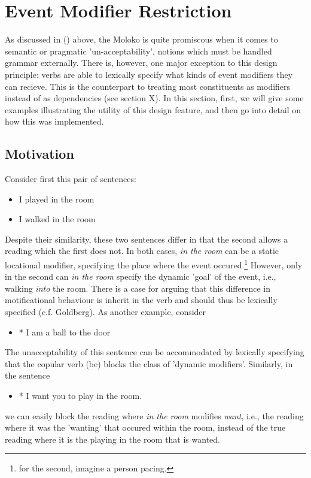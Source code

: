 \section{Event Modifier Restriction}
As discussed in () above, the Moloko is quite promiscous when it comes to  semantic or pragmatic 'un-acceptability', notions which must be handled grammar externally. There is, however, one major exception to this design principle: verbs are able to lexically specify what kinds of event modifiers they can recieve. This is the counterpart to treating most constituents as modifiers instead of as dependencies (see section X). In this section, first, we will give some examples illustrating the utility of this design feature, and then go into detail on how this was implemented.
\subsection{Motivation}
Consider first this pair of sentences:
\begin{itemize}
\item I played in the room
\item I walked in the room
\end{itemize}
Despite their similarity, these two sentences differ in that the second allows a reading which the first does not. 
In both cases, \emph{in the room} can be a static locational modifier, specifying the place where the event occured.\footnote{for the second, imagine a person pacing.} However, only in the second can \emph{in the room} specify the dynamic 'goal' of the event, i.e., walking \emph{into} the room. There is a case for arguing that this difference in motificational behaviour is inherit in the verb 
and should thus be lexically specified (c.f. Goldberg).  As another example, consider
\begin{itemize}
\item* I am a ball to the door
\end{itemize}
The unacceptability of this sentence can be accommodated by lexically specifying that the copular verb (be) blocks the class of 'dynamic modifiers'. Similarly, in the sentence
\begin{itemize}
\item* I want you to play in the room.
\end{itemize}
we can easily block the reading where \emph{in the room} modifies \emph{want}, i.e., the reading where it was the 'wanting' that occured within the room, instead of the true reading where it is the playing in the room that is wanted.

